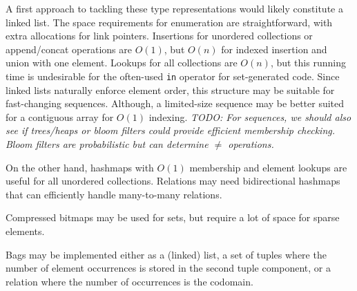 \documentclass{article}
\begin{document}
A first approach to tackling these type representations would likely constitute a linked list. The space requirements for enumeration are straightforward, with extra allocations for link pointers. Insertions for unordered collections or append/concat operations are $O(1)$, but $O(n)$ for indexed insertion and union with one element. Lookups for all collections are $O(n)$, but this running time is undesirable for the often-used \texttt{in} operator for set-generated code. Since linked lists naturally enforce element order, this structure may be suitable for fast-changing sequences. Although, a limited-size sequence may be better suited for a contiguous array for $O(1)$ indexing. \textit{TODO: For sequences, we should also see if trees/heaps or bloom filters could provide efficient membership checking. Bloom filters are probabilistic but can determine $\neq$ operations.}

On the other hand, hashmaps with $O(1)$ membership and element lookups are useful for all unordered collections. Relations may need bidirectional hashmaps that can efficiently handle many-to-many relations.

Compressed bitmaps may be used for sets, but require a lot of space for sparse elements.

Bags may be implemented either as a (linked) list, a set of tuples where the number of element occurrences is stored in the second tuple component, or a relation where the number of occurrences is the codomain.
\end{document}

